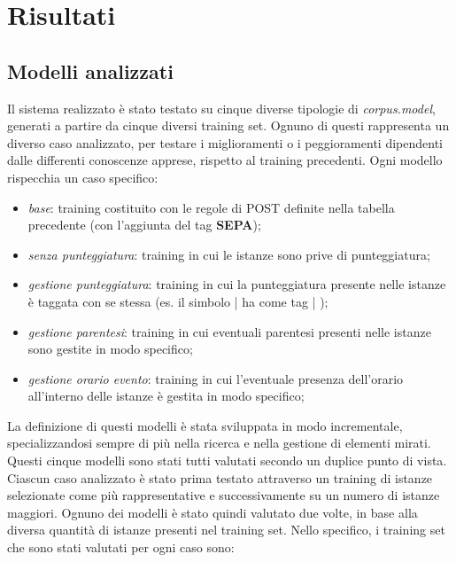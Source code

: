 \documentclass[a4paper]{report}
\begin{document}
\chapter{Risultati}
\section{Modelli analizzati}
Il sistema realizzato è stato testato su cinque diverse tipologie di \textit{corpus.model}, generati a partire da cinque diversi training set. Ognuno di questi rappresenta un diverso caso analizzato, per testare i miglioramenti o i peggioramenti dipendenti dalle differenti conoscenze apprese, rispetto al training precedenti. Ogni modello rispecchia un caso specifico:
\begin{itemize}
\item \textit{base}: training costituito con le regole di POST definite nella tabella precedente (con l'aggiunta del tag \textbf{SEPA});
\item \textit{senza punteggiatura}: training in cui le istanze sono prive di punteggiatura;
\item \textit{gestione punteggiatura}: training in cui la punteggiatura presente nelle istanze è taggata con se stessa (es. il simbolo | ha come tag | );
\item \textit{gestione parentesi}: training in cui eventuali parentesi presenti nelle istanze sono gestite in modo specifico;
\item \textit{gestione orario evento}: training in cui l'eventuale presenza dell'orario all'interno delle istanze è gestita in modo specifico;
\end{itemize}
La definizione di questi modelli è stata sviluppata in modo incrementale, specializzandosi sempre di più nella ricerca e nella gestione di elementi mirati.\\
Questi cinque modelli sono stati tutti valutati secondo un duplice punto di vista. Ciascun caso analizzato è stato prima testato attraverso un training di istanze selezionate come più rappresentative e successivamente su un numero di istanze maggiori. Ognuno dei modelli è stato quindi valutato due volte, in base alla diversa quantità di istanze presenti nel training set. Nello specifico, i training set che sono stati valutati per ogni caso sono:
\end{document}
